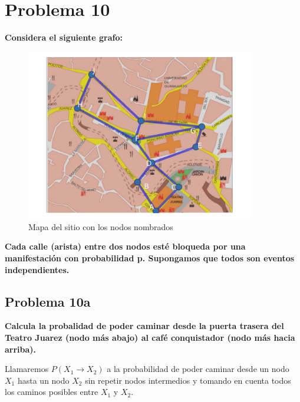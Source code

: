 \section*{Problema 10}
\textbf{Considera el siguiente grafo:}
\begin{figure}[H]
    \centering
    \includegraphics[width=10cm]{Graphics/map.png}
    \caption{Mapa del sitio con los nodos nombrados}
    \label{fig:map_with_letters}
\end{figure}
\textbf{Cada calle (arista) entre dos nodos esté bloqueda por una manifestación con probabilidad p. Supongamos que todos son eventos independientes.}
\subsection*{Problema 10a}
\textbf{Calcula la probalidad de poder caminar desde la puerta trasera del Teatro Juarez (nodo más abajo) al café conquistador (nodo más hacia arriba).}

Llamaremos $P(X_1\rightarrow X_2)$ a la probabilidad de poder caminar desde un nodo $X_1$ hasta un nodo $X_2$ sin repetir nodos intermedios y tomando en cuenta todos los caminos posibles entre $X_1$ y $X_2$.


